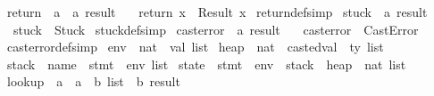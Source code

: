 \begin{isabellebody}
\isanewline
{}\isamarkupfalse \ return\ {\isacharcolon}{\isacharcolon}\ {\isachardoublequoteopen}{\isacharprime}a\ {\isasymRightarrow}\ {\isacharprime}a\ result{\isachardoublequoteclose}\ \isanewline
\ \ {\isachardoublequoteopen}return\ x\ {\isasymequiv}\ Result\ x{\isachardoublequoteclose}\isanewline
{}\isamarkupfalse \ return{\isacharunderscore}def{\isacharbrackleft}simp{\isacharbrackright}\isanewline
\isanewline
{}\isamarkupfalse \ stuck\ {\isacharcolon}{\isacharcolon}\ {\isachardoublequoteopen}{\isacharprime}a\ result{\isachardoublequoteclose}\ \isanewline
\ \ {\isachardoublequoteopen}stuck\ {\isasymequiv}\ Stuck{\isachardoublequoteclose}\isanewline
{}\isamarkupfalse \ stuck{\isacharunderscore}def{\isacharbrackleft}simp{\isacharbrackright}\isanewline
\isanewline
{}\isamarkupfalse \ cast{\isacharunderscore}error\ {\isacharcolon}{\isacharcolon}\ {\isachardoublequoteopen}{\isacharprime}a\ result{\isachardoublequoteclose}\ \isanewline
\ \ {\isachardoublequoteopen}cast{\isacharunderscore}error\ {\isasymequiv}\ CastError{\isachardoublequoteclose}\isanewline
{}\isamarkupfalse \ cast{\isacharunderscore}error{\isacharunderscore}def{\isacharbrackleft}simp{\isacharbrackright}
\isamarkuptrue {}\isamarkupfalse \ env\ {\isacharequal}\ {\isachardoublequoteopen}{\isacharparenleft}nat\ {\isasymtimes}\ val{\isacharparenright}\ list{\isachardoublequoteclose}\isanewline
{}
\isanewline
{}\isamarkupfalse \ heap\ {\isacharequal}\ {\isachardoublequoteopen}{\isacharparenleft}nat\ {\isasymtimes}\ {\isacharparenleft}casted{\isacharunderscore}val\ {\isasymtimes}\ ty{\isacharparenright}{\isacharparenright}\ list{\isachardoublequoteclose}\isanewline
{}\isamarkupfalse \ stack\ {\isacharequal}\ {\isachardoublequoteopen}{\isacharparenleft}name\ {\isasymtimes}\ stmt\ {\isasymtimes}\ env{\isacharparenright}\ list{\isachardoublequoteclose}\isanewline
{}\isamarkupfalse \ state\ {\isacharequal}\ {\isachardoublequoteopen}stmt\ {\isasymtimes}\ env\ {\isasymtimes}\ stack\ {\isasymtimes}\ heap\ {\isasymtimes}\ nat\ list{\isachardoublequoteclose}\isanewline
\isanewline
{}\isamarkupfalse \ lookup\ {\isacharcolon}{\isacharcolon}\ {\isachardoublequoteopen}{\isacharprime}a\ {\isasymRightarrow}\ {\isacharparenleft}{\isacharprime}a\ {\isasymtimes}\ {\isacharprime}b{\isacharparenright}\ list\ {\isasymRightarrow}\ {\isacharprime}b\ result{\isachardoublequoteclose}\ \isanewline

\end{isabellebody}
